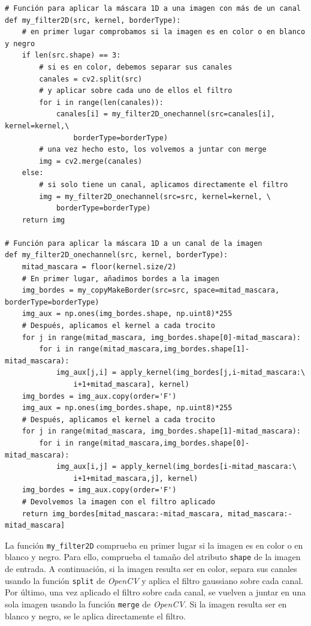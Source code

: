 \documentclass[11pt,a4paper]{article}
\theoremstyle{plain}
\theoremstyle{definition}
\begin{document}
\begin{verbatim}
# Función para aplicar la máscara 1D a una imagen con más de un canal
def my_filter2D(src, kernel, borderType):
    # en primer lugar comprobamos si la imagen es en color o en blanco y negro
    if len(src.shape) == 3:
        # si es en color, debemos separar sus canales
        canales = cv2.split(src)
        # y aplicar sobre cada uno de ellos el filtro
        for i in range(len(canales)):
            canales[i] = my_filter2D_onechannel(src=canales[i], kernel=kernel,\
                borderType=borderType)
        # una vez hecho esto, los volvemos a juntar con merge
        img = cv2.merge(canales)
    else:
        # si solo tiene un canal, aplicamos directamente el filtro
        img = my_filter2D_onechannel(src=src, kernel=kernel, \
            borderType=borderType)
    return img

# Función para aplicar la máscara 1D a un canal de la imagen
def my_filter2D_onechannel(src, kernel, borderType):
    mitad_mascara = floor(kernel.size/2)
    # En primer lugar, añadimos bordes a la imagen
    img_bordes = my_copyMakeBorder(src=src, space=mitad_mascara, borderType=borderType)
    img_aux = np.ones(img_bordes.shape, np.uint8)*255
    # Después, aplicamos el kernel a cada trocito
    for j in range(mitad_mascara, img_bordes.shape[0]-mitad_mascara):
        for i in range(mitad_mascara,img_bordes.shape[1]-mitad_mascara):
            img_aux[j,i] = apply_kernel(img_bordes[j,i-mitad_mascara:\
                i+1+mitad_mascara], kernel)
    img_bordes = img_aux.copy(order='F')
    img_aux = np.ones(img_bordes.shape, np.uint8)*255
    # Después, aplicamos el kernel a cada trocito
    for j in range(mitad_mascara, img_bordes.shape[1]-mitad_mascara):
        for i in range(mitad_mascara,img_bordes.shape[0]-mitad_mascara):
            img_aux[i,j] = apply_kernel(img_bordes[i-mitad_mascara:\
                i+1+mitad_mascara,j], kernel)
    img_bordes = img_aux.copy(order='F')
    # Devolvemos la imagen con el filtro aplicado
    return img_bordes[mitad_mascara:-mitad_mascara, mitad_mascara:-mitad_mascara]
\end{verbatim}

La función \texttt{my\_filter2D} comprueba en primer lugar si la imagen es en color o en blanco y negro. Para ello, comprueba el tamaño del atributo \texttt{shape} de la imagen de entrada. A continuación, si la imagen resulta ser en color, separa sus canales usando la función \texttt{split} de \textit{OpenCV} y aplica el filtro gaussiano sobre cada canal. Por último, una vez aplicado el filtro sobre cada canal, se vuelven a juntar en una sola imagen usando la función \texttt{merge} de \textit{OpenCV}. Si la imagen resulta ser en blanco y negro, se le aplica directamente el filtro.
\end{document}
